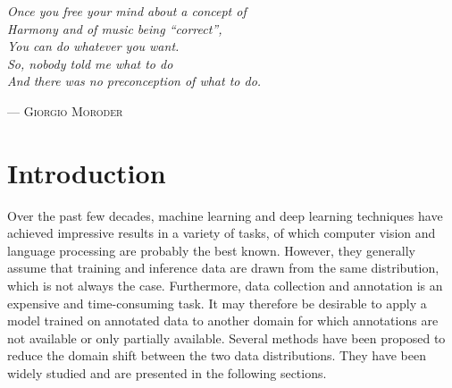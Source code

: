 \documentclass[%
    corpo=12pt,
    twoside,
    stile=classica,   
    tipotesi=magistrale,
    evenboxes,
    english,
	numerazioneromana,
]{toptesi}
\newcommand{\quotes}[1]{``#1''}
\begin{document}

\english

\vspace*{1cm}
\renewcommand{\epigraphsize}{\normalsize}
\setlength{\epigraphwidth}{0.56\textwidth}
\renewcommand{\sourceflush}{flushright}
\let\originalepigraph\epigraph 
\renewcommand\epigraph[2]{\originalepigraph{\textit{#1}}{\textsc{#2}}}
\epigraph{Once you free your mind about a concept of\\Harmony and of music being \quotes{correct},\\You can do whatever you want.\\So, nobody told me what to do\\And there was no preconception of what to do.}{--- Giorgio Moroder}

\paginavuota

\indici

\mainmatter
\english

\chapter*{Introduction}
Over the past few decades, machine learning and deep learning techniques have achieved impressive results in a variety of tasks, of which computer vision and language processing are probably the best known. However, they generally assume that training and inference data are drawn from the same distribution, which is not always the case. Furthermore, data collection and annotation is an expensive and time-consuming task. It may therefore be desirable to apply a model trained on annotated data to another domain for which annotations are not available or only partially available. Several methods have been proposed to reduce the domain shift between the two data distributions. They have been widely studied and are presented in the following sections.
\end{document}
